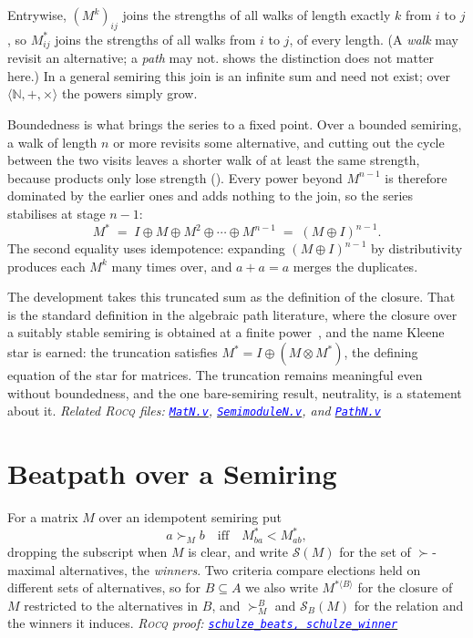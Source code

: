 \documentclass[a4paper,UKenglish,cleveref,autoref,thm-restate,anonymous]{lipics-v2021}
\newcommand{\Mstar}{M^{\ast}}
\newcommand{\clo}[2]{#1^{\ast\langle #2\rangle}}
\newcommand{\rocq}{\textsc{Rocq}}
\newcommand{\anonrepo}{https://anonymous.4open.science/r/Semiring_graph_algorithm-000E}
\newcommand{\rocqfile}[2]{\href{\anonrepo/#1}{\textcolor{blue}{\texttt{#2}}}}
\newcommand{\proofat}[2]{{\footnotesize\itshape\rocq{} proof: \rocqfile{#1}{#2}}}
\newcommand{\rocqrelated}[1]{{\footnotesize\itshape Related \rocq{} files: #1}}
\begin{document}
Entrywise, $(M^{k})_{ij}$ joins the strengths of all walks of length
exactly $k$ from $i$ to $j$, so $\Mstar_{ij}$ joins the strengths of all
walks from $i$ to $j$, of every length. (A \emph{walk} may revisit an
alternative; a \emph{path} may not.  shows the distinction
does not matter here.) In a general semiring this join is an infinite sum
and need not exist; over $\langle \mathbb{N}, +, \times\rangle$ the powers
simply grow.

Boundedness is what brings the series to a fixed point. Over a bounded
semiring, a walk of length $n$ or more revisits some alternative, and
cutting out the cycle between the two visits leaves a shorter walk of at
least the same strength, because products only lose strength
(). Every power beyond $M^{n-1}$ is therefore dominated
by the earlier ones and adds nothing to the join, so the series stabilises
at stage $n-1$:
\[
  \Mstar \;=\; I \oplus M \oplus M^{2} \oplus \cdots \oplus M^{n-1}
  \;=\; (M \oplus I)^{n-1}.
\]
The second equality uses idempotence: expanding $(M \oplus I)^{n-1}$ by
distributivity produces each $M^{k}$ many times over, and $a + a = a$
merges the duplicates.

The development takes this truncated sum as the definition of the closure.
That is the standard definition in the algebraic path literature, where
the closure over a suitably stable semiring is obtained at a finite
power~\cite{carre1971algebra,lehmann1977}, and the name Kleene star is
earned: the truncation satisfies $\Mstar = I \oplus (M \otimes \Mstar)$,
the defining equation of the star for matrices. The truncation remains
meaningful even without boundedness, and the one bare-semiring result,
neutrality, is a statement about it.
\rocqrelated{\rocqfile{algorithm/MatN.v}{MatN.v},
\rocqfile{algorithm/SemimoduleN.v}{SemimoduleN.v}, and
\rocqfile{algorithm/PathN.v}{PathN.v}}

\section{Beatpath over a Semiring}\label{sec:framework}

\begin{definition}\label{def:succ}
For a matrix $M$ over an idempotent semiring put
\[
  a \succ_M b \quad\text{iff}\quad \Mstar_{ba} < \Mstar_{ab},
\]
dropping the subscript when $M$ is clear, and write $\mathcal{S}(M)$ for the
set of $\succ$-maximal alternatives, the \emph{winners}. Two criteria
compare elections held on different sets of alternatives, so for
$B \subseteq A$ we also write $\clo{M}{B}$ for the closure of $M$
restricted to the alternatives in $B$, and $\succ^{B}_{M}$ and
$\mathcal{S}_{B}(M)$ for the relation and the winners it induces.
\proofat{algorithm/SchulzeDefsN.v}{schulze\_beats, schulze\_winner}
\end{definition}
\end{document}
